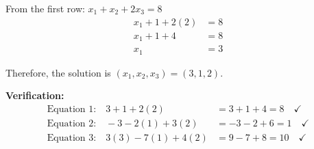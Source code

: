 From the first row: $x_1 + x_2 + 2x_3 = 8$
\begin{align*}
x_1 + 1 + 2(2) &= 8\\
x_1 + 1 + 4 &= 8\\
x_1 &= 3
\end{align*}

Therefore, the solution is $\boxed{(x_1, x_2, x_3) = (3, 1, 2)}$.

\textbf{Verification:}
\begin{align*}
\text{Equation 1:} \quad 3 + 1 + 2(2) &= 3 + 1 + 4 = 8 \quad \checkmark\\
\text{Equation 2:} \quad -3 - 2(1) + 3(2) &= -3 - 2 + 6 = 1 \quad \checkmark\\
\text{Equation 3:} \quad 3(3) - 7(1) + 4(2) &= 9 - 7 + 8 = 10 \quad \checkmark
\end{align*}